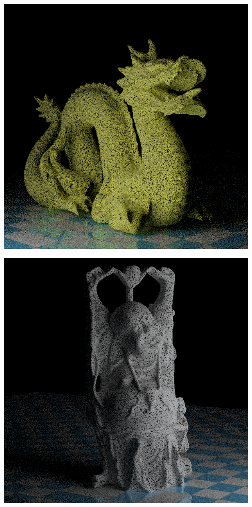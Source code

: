 \begin{center}
\begin{minipage}{0.48\linewidth}
\includegraphics[width=\linewidth]{img/dragon.png}
\end{minipage}
\begin{minipage}{0.48\linewidth}
\includegraphics[width=\linewidth]{img/fatty.png}
\end{minipage}
\end{center}


